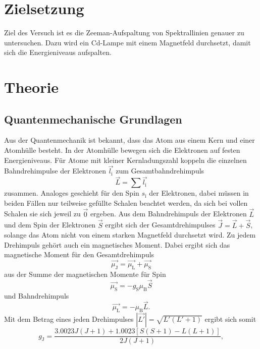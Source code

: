 \section{Zielsetzung}
\label{sec:Zielsetzung}
Ziel des Versuch ist es die Zeeman-Aufspaltung von Spektrallinien genauer zu untersuchen.
Dazu wird ein Cd-Lampe mit einem Magnetfeld durchsetzt, damit sich die Energieniveaus aufspalten.

\section{Theorie}
\label{sec:Theorie}
\subsection{Quantenmechanische Grundlagen}
\label{sec:qm}
Aus der Quantenmechanik ist bekannt, dass das Atom aus einem Kern und einer Atomhülle besteht.
In der Atomhülle bewegen sich die Elektronen auf festen Energieniveaus.
Für Atome mit kleiner Kernladungszahl koppeln die einzelnen Bahndrehimpulse der Elektronen $\vec{l_\text{i}}$
zum Gesamtbahndrehimpuls
\begin{equation*}
    \vec{L} = \sum{\vec{l_\text{i}}}
\end{equation*} 
zusammen. Analoges geschieht für den Spin $s_\text{i}$ der Elektronen, dabei
müssen in beiden Fällen nur teilweise gefüllte Schalen beachtet werden, da sich bei vollen Schalen sie sich
jeweil zu $\vec{0}$ ergeben.
Aus dem Bahndrehimpuls der Elektronen $\vec{L}$ und dem Spin der Elektronen $\vec{S}$ ergibt sich der
Gesamtdrehimpulses $\vec{J} = \vec{L} + \vec{S}$, solange das Atom nicht von einem starken Magnetfeld durchsetzt wird.
Zu jedem Drehimpuls gehört auch ein magnetisches Moment.
Dabei ergibt sich das magnetische Moment für den Gesamtdrehimpuls 
\begin{equation*}
  \vec{\mu_\text{J}} = \vec{\mu_\text{L}} + \vec{\mu_\text{S}}
\end{equation*}
aus der Summe der magnetischen Momente für Spin 
\begin{equation}
\label{eqn:magspin}
  \vec{\mu_\text{S}} = -g_\text{S} \mu_\text{B} \vec{S}
\end{equation}
und Bahndrehimpuls
\begin{equation}
  \label{ean:magbahn}
  \vec{\mu_\text{L}} = - \mu_\text{B} \vec{L}.
\end{equation}
Mit dem Betrag eines jeden Drehimpulses $|\vec{L'}| = \sqrt{L' \left(L'+1\right)}$ ergibt sich somit
\begin{equation}
  \label{eqn:gj}
  g_\text{J} = \frac{\num{3.0023}J(J+1)+\num{1.0023}[S(S+1)-L(L+1)]}{2J(J+1)},
\end{equation}
